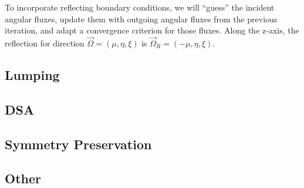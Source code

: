 \documentclass[12pt]{article}
\begin{document}
To incorporate reflecting boundary conditions, we will ``guess'' the incident angular fluxes, update them with outgoing angular fluxes from the previous iteration, and adapt a convergence criterion for those fluxes. Along the z-axis, the reflection for direction $\vec{\Omega} = (\mu, \eta, \xi)$ is $\vec{\Omega}_R = (-\mu, \eta, \xi)$.


\subsection{Lumping}

\subsection{DSA}

\subsection{Symmetry Preservation}

\subsection{Other}



%
%
\end{document}
